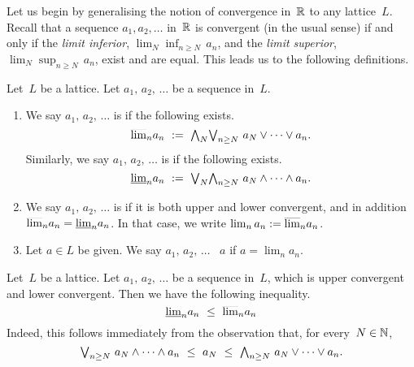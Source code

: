 \documentclass[main.tex]{subfiles}
\begin{document}
%
%
Let us begin by generalising the notion of convergence in~$\mathbb{R}$
to any lattice~$L$.
Recall that a sequence $a_1,a_2,\dotsc$ in~$\mathbb{R}$
is convergent (in the usual sense) if and only if 
the \emph{limit inferior}, $\lim_{N} \inf_{n\geq N}\,a_n$,
and the \emph{limit superior}, $\lim_{N} \sup_{n\geq N}\,a_n$,
exist and are equal.
This leads us to the following definitions.
\begin{dfn}
\label{D:conv}
Let~$L$ be a lattice.
Let $a_1,\,a_2,\,\dotsc$ be a sequence in~$L$.
\begin{enumerate}
\item
We say $a_1,\,a_2,\,\dotsc$ 
is 
if the following exists.
\begin{equation*}
\ulim{n} a_n \ \eqdf\ \bw_N\bv_{n\geq N}\ a_N \vee \dotsb \vee a_n.
\end{equation*}
Similarly,
we say $a_1,\,a_2,\,\dotsc$ is 
if the following exists.
\begin{equation*}
\llim{n} a_n \ \eqdf\ \bv_N\bw_{n\geq N}\ a_N \wedge \dotsb \wedge a_n.
\end{equation*}

\item
We say $a_1,\,a_2,\,\dotsc$ is 
if it is both upper and lower convergent,
and in addition $\smash{\overline{\lim}_{n}}a_n = \smash{\underline{\lim}_{n}}a_n$.
In that case,
we write $\lim_n a_n:=\smash{\overline{\lim}_{n}} a_n$.

\item
Let $a\in L$ be given.
We say $a_1,\,a_2,\,\dotsc$ 
~$a$
if  $a=\lim_n a_n$.
\end{enumerate}
\end{dfn}
%
%
\begin{rem}
\label{R:conv}
Let~$L$ be a lattice.
Let $a_1,\,a_2,\,\dotsc$ be a sequence in~$L$,
which is  upper convergent and lower convergent.
Then we have the following inequality.
\begin{equation*}
\llim{n} a_n \ \leq\ \ulim{n} a_n
\end{equation*}
Indeed,
this follows immediately from the observation
that, for every~$N\in\mathbb{N}$,
\begin{equation*}
\bv_{n\geq N}\ a_N \wedge \dotsb \wedge a_n
\ \leq\  a_N\ \leq\ 
\bw_{n\geq N}\ a_N \vee \dotsb \vee a_n.
\end{equation*}
\end{rem}
%
\end{document}
